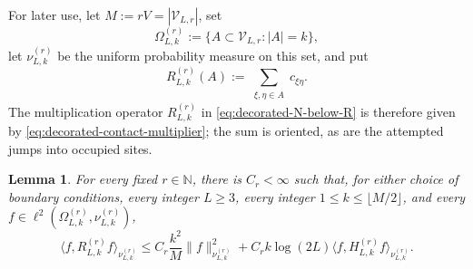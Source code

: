 \documentclass[11pt]{article}
\numberwithin{equation}{section}
\newtheorem{lemma}[theorem]{Lemma}
\theoremstyle{remark}
\newcommand{\1}{\mathbf 1}
\begin{document}
For later use, let \(M:=rV=|\mathcal V_{L,r}|\), set
\[
 \Omega_{L,k}^{(r)}:=
 \{A\subset\mathcal V_{L,r}:|A|=k\},
\]
let \(\nu_{L,k}^{(r)}\) be the uniform probability measure on this set,
and put
\begin{equation}
 R_{L,k}^{(r)}(A)
 :=\sum_{\substack{\xi,\eta\in A}}c_{\xi\eta}.
 \label{eq:decorated-contact-multiplier}
\end{equation}
The multiplication operator \(R_{L,k}^{(r)}\) in
\eqref{eq:decorated-N-below-R} is therefore given by
\eqref{eq:decorated-contact-multiplier}; the sum is oriented, as are the
attempted jumps into occupied sites.

\begin{lemma}
\label{lem:decorated-contact-bound}
For every fixed \(r\in\mathbb N\), there is \(C_r<\infty\) such that,
for either choice of boundary conditions, every integer \(L\geq3\), every
integer \(1\leq k\leq\lfloor M/2\rfloor\), and every
\(f\in\ell^2(\Omega_{L,k}^{(r)},\nu_{L,k}^{(r)})\),
\begin{equation}
 \langle f,R_{L,k}^{(r)}f\rangle_{\nu_{L,k}^{(r)}}
 \leq C_r\frac{k^2}{M}\|f\|_{\nu_{L,k}^{(r)}}^2
 +C_rk\log(2L)
 \langle f,H_{L,k}^{(r)}f\rangle_{\nu_{L,k}^{(r)}}.
 \label{eq:decorated-contact-bound}
\end{equation}
\end{lemma}
\end{document}
